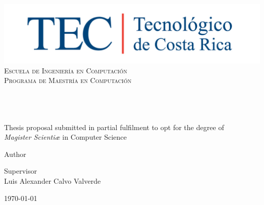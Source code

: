 \begin{titlepage}

\begin{center}

\vfill


\includegraphics[width=1\textwidth]{../images/TECRGB.jpg}
\\[0.2cm]
\textcolor{tecblue}{
\textsc{\LARGE Escuela de Ingeniería en Computación}\\[0.2cm]
\textsc{\large Programa de Maestría en Computación}\\
}
\vfill
 
\HRule
\\[0.9cm]
\doublespacing
{ \huge \bfseries \thesistitle}
\\[0.4cm]
\singlespacing
\HRule
\\[0.9cm]

{\large Thesis proposal submitted in partial fulfilment to opt for the degree of 
\\[1cm]
\textit{Magister Scientiæ} in Computer Science}
\\
\vfill
 
\begin{minipage}{0.45\textwidth}
\begin{flushleft} \large
Author\\
\pdfauthor 
\end{flushleft}
\end{minipage}
\begin{minipage}{0.50\textwidth}
\begin{flushright} \large
Supervisor\\
{Luis Alexander Calvo Valverde}
\end{flushright}
\end{minipage}
 
 
\vfill
 
{\large \today \\}  \hfill{} 


\end{center}
\end{titlepage}

